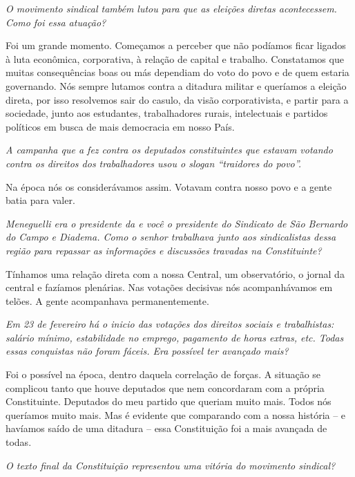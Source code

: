 \medskip

\noindent\emph{O movimento sindical também lutou para que as eleições diretas
acontecessem. Como foi essa atuação?}

Foi um grande momento. Começamos a perceber que não
podíamos ficar ligados à luta econômica, corporativa, à relação de
capital e trabalho. Constatamos que muitas consequências boas ou más
dependiam do voto do povo e de quem estaria governando. Nós sempre
lutamos contra a ditadura militar e queríamos a eleição direta, por isso
resolvemos sair do casulo, da visão corporativista, e partir para a
sociedade, junto aos estudantes, trabalhadores rurais, intelectuais e
partidos políticos em busca de mais democracia em nosso País.

\medskip

\noindent\emph{A campanha que a  fez contra os deputados constituintes que
estavam votando contra os direitos dos trabalhadores usou o slogan
``traidores do povo''.}

Na época nós os considerávamos assim. Votavam
contra nosso povo e a gente batia para valer.

\medskip

\noindent\emph{Meneguelli era o presidente da  e você o presidente do
Sindicato de São Bernardo do Campo e Diadema. Como o senhor trabalhava
junto aos sindicalistas dessa região para repassar as informações e
discussões travadas na Constituinte?}

Tínhamos uma relação direta com a nossa Central, um
observatório, o jornal da central e fazíamos plenárias. Nas votações
decisivas nós acompanhávamos em telões. A gente acompanhava
permanentemente.

\medskip

\noindent\emph{Em 23 de fevereiro há o inicio das votações dos direitos sociais
e trabalhistas: salário mínimo, estabilidade no emprego, pagamento de
horas extras, etc. Todas essas conquistas não foram fáceis. Era
possível ter avançado mais?}

Foi o possível na época, dentro daquela correlação
de forças. A situação se complicou tanto que houve deputados que nem
concordaram com a própria Constituinte. Deputados do meu partido que
queriam muito mais. Todos nós queríamos muito mais. Mas é evidente que
comparando com a nossa história -- e havíamos saído de uma ditadura --
essa Constituição foi a mais avançada de todas.

\medskip

\noindent\emph{O texto final da Constituição representou uma vitória do
movimento sindical?}

